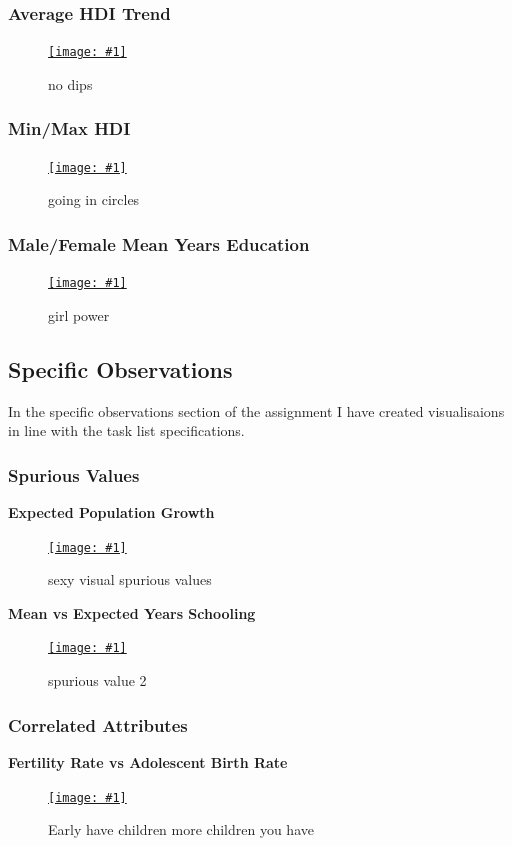 \documentclass[11pt,a4paper,draft]{article}
\newcommand\onlinefig[3]{
\begin{figure}[H]
  \centering
  \href{#3}{\texttt{[image: \#1]}}
  \caption{#2} 
  \label{fig:#1}
\end{figure}
}
\begin{document}
\begin{multicols}{2}
\subsubsection{Average HDI Trend}
\onlinefig{global_average_hdi_areachart}{no dips}{https://public.tableau.com/views/CS3205_hdi_csv/Sheet2?:language=en-GB&:display_count=n&:origin=viz_share_link}

\subsubsection{Min/Max HDI}
\onlinefig{min_vs_max_hdi_radialplot}{going in circles}{https://user-images.githubusercontent.com/56483187/155840052-f17e03e9-c48b-4dfd-8096-2bd5f066dd91.png}

\subsubsection{Male/Female Mean Years Education}
\onlinefig{men_vs_women_mean_years_education_barchart}{girl power}{https://public.tableau.com/views/CS3205-HDI/Sheet2?:language=en-GB&:display_count=n&:origin=viz_share_link}


\subsection{Specific Observations}
In the specific observations section of the assignment I have created visualisaions in line with the task list specifications.

\subsubsection{Spurious Values}
\textbf{Expected Population Growth}
\onlinefig{population_growth_ratio_boxplot}{sexy visual spurious values}{https://public.tableau.com/views/CS3205-HDI/Sheet11?:language=en-GB&:display_count=n&:origin=viz_share_link}

\begin{flushleft}
\textbf{Mean vs Expected Years Schooling}
\end{flushleft}
\vspace{-2cm}
\onlinefig{mean_vs_expected_years_schooling_scatterplot.png}{spurious value 2}{https://public.tableau.com/views/CS3205-HDI/Sheet7?:language=en-GB&:display_count=n&:origin=viz_share_link}

\subsubsection{Correlated Attributes}
\begin{flushleft}
\textbf{Fertility Rate vs Adolescent Birth Rate}
\end{flushleft}
\onlinefig{fertility_vs_adolescent_birth_rate_scatterplot}{Early have children more children you have}{https://public.tableau.com/views/CS3205-HDI/Sheet10?:language=en-GB&:display_count=n&:origin=viz_share_link}


\end{multicols}
\end{document}
